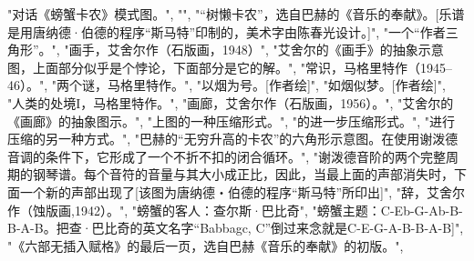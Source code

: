 "对话《螃蟹卡农》模式图。",
"",
"“树懒卡农”，选自巴赫的《音乐的奉献》。[乐谱是用唐纳德·伯德的程序“斯马特”印制的，美术字由陈春光设计。]",
"一个“作者三角形”。",
"\label {fig:135}画手，艾舍尔作（石版画，1948）",
"艾舍尔的《画手》的抽象示意图，上面部分似乎是个悖论，下面部分是它的解。",
"常识，马格里特作（1945--46）。",
"两个谜，马格里特作。",
"\label {fig:139}以烟为号。[作者绘]",
"如烟似梦。[作者绘]",
"人类的处境I，马格里特作。",
"\label {fig:142}画廊，艾舍尔作（石版画，1956）。",
"艾舍尔的《画廊》的抽象图示。",
"上图的一种压缩形式。",
"的进一步压缩形式。",
"进行压缩的另一种方式。",
"巴赫的“无穷升高的卡农”的六角形示意图。在使用谢泼德音调的条件下，它形成了一个不折不扣的闭合循环。",
"谢泼德音阶的两个完整周期的钢琴谱。每个音符的音量与其大小成正比，因此，当最上面的声部消失时，下面一个新的声部出现了[该图为唐纳德・伯德的程序“斯马特”所印出]",
"\label {fig:149}辞，艾舍尔作（蚀版画,1942）。",
"螃蟹的客人：查尔斯·巴比奇",
"螃蟹主题：C-Eb-G-Ab-B-B-A-B。把查·巴比奇的英文名字“Babbagc, C”倒过来念就是C-E-G-A-B-B-A-B]",
"《六部无插入赋格》的最后一页，选自巴赫《音乐的奉献》的初版。",

